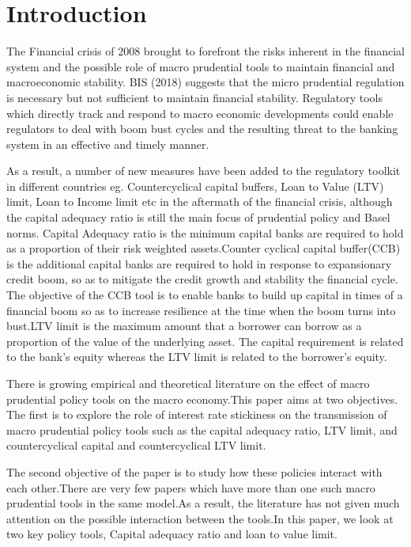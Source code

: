 \documentclass[12pt]{article}
\numberwithin{equation}{section}
\begin{document}
\section{Introduction}

The Financial crisis of 2008 brought to forefront the risks inherent in the financial system and the possible role of macro prudential tools to maintain financial and macroeconomic stability.  BIS (2018) suggests that the micro prudential regulation is necessary but not sufficient to maintain financial stability. Regulatory tools which directly track and respond to macro economic developments could enable regulators to deal with boom bust cycles and the resulting threat to the banking system in an effective and timely manner.

As a result, a number of new measures have been added to the regulatory toolkit in different countries eg. Countercyclical capital buffers, Loan to Value (LTV) limit, Loan to Income limit etc in the aftermath of the financial crisis, although the capital adequacy ratio is still the main focus of prudential policy and Basel norms.
Capital Adequacy ratio is the minimum capital banks are required to hold as a proportion of their risk weighted assets.Counter cyclical capital buffer(CCB) is the additional capital banks are required to hold in response to expansionary credit boom, so as to mitigate the credit growth and stability the financial cycle. The objective of the CCB tool is to enable banks to build up capital in times of a financial boom so as to increase resilience at the time when the boom turns into bust.LTV limit is the maximum amount that a borrower can borrow as a proportion of the value of the underlying asset. The capital requirement is related to the bank's equity whereas the LTV limit is related to the borrower's equity.

There is growing empirical and theoretical literature on the effect of macro prudential policy tools on the macro economy.This paper aims at two objectives. The first is to explore the role of interest rate stickiness on the transmission of macro prudential policy tools such as the capital adequacy ratio, LTV limit, and countercyclical capital and countercyclical LTV limit.

The second objective of the paper is to study how these policies interact with each other.There are very few papers which have more than one such macro prudential tools in the same model.As a result, the literature has not given much attention on the possible interaction between the tools.In this paper, we look at two key policy tools, Capital adequacy ratio and loan to value limit.
\end{document}

